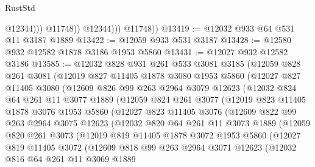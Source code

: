 \begin{lexlean}{RustStd}
\begin{coremodule}
{\begin{coremodule}
{{{{{{{{{{{{{{{{{{{{{{{{{{{{{                        @12344)))
                  @11748))
              @12344)))
        @11748))
@13419 := @12032 @933 @64 @531 @11 @3187 @1889
@13422 := @12059 @933 @531 @3187
@13428 := @12580 @932 @12582 @1878 @3186 @1953 @5860
@13431 := @12027 @932 @12582 @3186
@13585 := @12032
    @828
    @931
    @261
    @533
    @3081
    @3185
    (@12059
      @828
      @261
      @3081
      (@12019
        @827
        @11405
        @1878
        @3080
        @1953
        @5860
        (@12027
          @827
          @11405
          @3080
          (@12609
            @826
            @99
            @263
            @2964
            @3079
            @12623
            (@12032
              @824
              @64
              @261
              @11
              @3077
              @1889
              (@12059
                @824
                @261
                @3077
                (@12019
                  @823
                  @11405
                  @1878
                  @3076
                  @1953
                  @5860
                  (@12027
                    @823
                    @11405
                    @3076
                    (@12609
                      @822
                      @99
                      @263
                      @2964
                      @3075
                      @12623
                      (@12032
                        @820
                        @64
                        @261
                        @11
                        @3073
                        @1889
                        (@12059
                          @820
                          @261
                          @3073
                          (@12019
                            @819
                            @11405
                            @1878
                            @3072
                            @1953
                            @5860
                            (@12027
                              @819
                              @11405
                              @3072
                              (@12609
                                @818
                                @99
                                @263
                                @2964
                                @3071
                                @12623
                                (@12032
                                  @816
                                  @64
                                  @261
                                  @11
                                  @3069
                                  @1889
}}}}}}}}}}}}}}}}}}}}}}}}}}}}}
\end{coremodule}}
\end{coremodule}
\end{lexlean}

